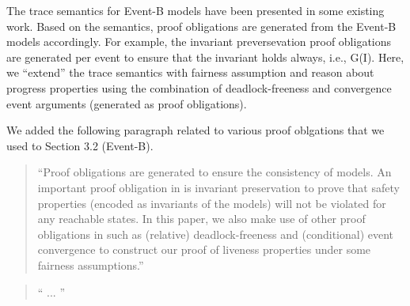 \documentclass{response}
\begin{document}
\begin{response}
  The trace semantics for Event-B models have been presented in some
  existing work. Based on the semantics, proof obligations are
  generated from the Event-B models accordingly. For example, the
  invariant preversevation proof obligations are generated per event
  to ensure that the invariant holds always, i.e., G(I). Here, we
  ``extend'' the trace semantics with fairness assumption and reason
  about progress properties using the combination of deadlock-freeness
  and convergence event arguments (generated as proof obligations).

  We added the following paragraph related to various proof oblgations
  that we used to Section 3.2 (Event-B).
  \begin{quote}
    ``Proof obligations are generated to ensure the consistency of
  \mbox{\EventB} models.  An important proof obligation in
  \mbox{\EventB} is invariant preservation to prove that safety
  properties (encoded as invariants of the models) will not be violated
  for any reachable states. In this paper, we also make use of other
  proof obligations in \mbox{\EventB} such as (relative)
  deadlock-freeness and (conditional) event convergence to construct
  our proof of liveness properties under some fairness assumptions.''
  \end{quote}
\end{response}

\begin{comment}{Reviewer \#1}
- Proof of fairness properties. In order to deal with fairness properties
you advocate a strong fairness assumption. From my point a view, this
is a strong operating assumption. May be you could comment on that?
Last, but may be I am wrong, I have the intuition that weak fairness
for the events handling dequeuing external triggers would be enough?
Please could you comment?
\end{comment}

\begin{response}
  
  \begin{quote}
    `` ...
   ''
  \end{quote}
\end{response}

\begin{comment}{Reviewer \#1}
• p.2 The three rules are not at the same level. The first ones are expressed 
explicitely in terms of Event-B refinement features, while the third one 
addresses statecharts.
\end{comment}
\end{document}
